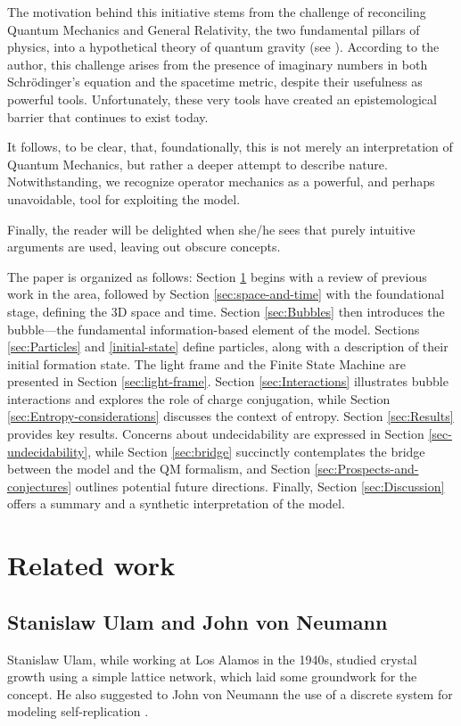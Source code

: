 \documentclass[12pt,english]{article}
\begin{document}
The motivation behind this initiative stems from the challenge of reconciling Quantum Mechanics and General Relativity, the two fundamental pillars of physics, into a hypothetical theory of quantum gravity (see \cite{rovelli,wald}). According to the author, this challenge arises from the presence of imaginary numbers in both Schrödinger's equation and the spacetime metric, despite their usefulness as powerful tools. Unfortunately, these very tools have created an epistemological barrier that continues to exist today.

It follows, to be clear, that, foundationally, this is not merely an interpretation of Quantum Mechanics, but rather a deeper attempt to describe nature. Notwithstanding, we recognize operator mechanics as a powerful, and perhaps unavoidable, tool for exploiting the model.

Finally, the reader will be delighted when she/he sees that purely intuitive arguments are used, leaving out obscure concepts.

The paper is organized as follows: Section \ref{sec:related-work} begins with a review of previous work in the area, followed by Section \ref{sec:space-and-time} with the foundational stage, defining the 3D space and time. Section \ref{sec:Bubbles} then introduces the bubble—the fundamental information-based element of the model. Sections \ref{sec:Particles} and \ref{initial-state} define particles, along with a description of their initial formation state. The light frame and the Finite State Machine are presented in Section \ref{sec:light-frame}. Section \ref{sec:Interactions} illustrates bubble interactions and explores the role of charge conjugation, while Section \ref{sec:Entropy-considerations} discusses the context of entropy. Section \ref{sec:Results} provides key results. Concerns about undecidability are expressed in Section \ref{sec-undecidability}, while Section \ref{sec:bridge} succinctly contemplates the bridge between the model and the QM formalism, and Section \ref{sec:Prospects-and-conjectures} outlines potential future directions. Finally, Section \ref{sec:Discussion} offers a summary and a synthetic interpretation of the model.

\section{Related work} \label{sec:related-work}

\subsection*{Stanislaw Ulam and John von Neumann}
Stanislaw Ulam, while working at Los Alamos in the 1940s, studied crystal growth using a simple lattice network, which laid some groundwork for the concept. He also suggested to John von Neumann the use of a discrete system for modeling self-replication \cite{ulam1952,vonNeumann1966}.
\end{document}
